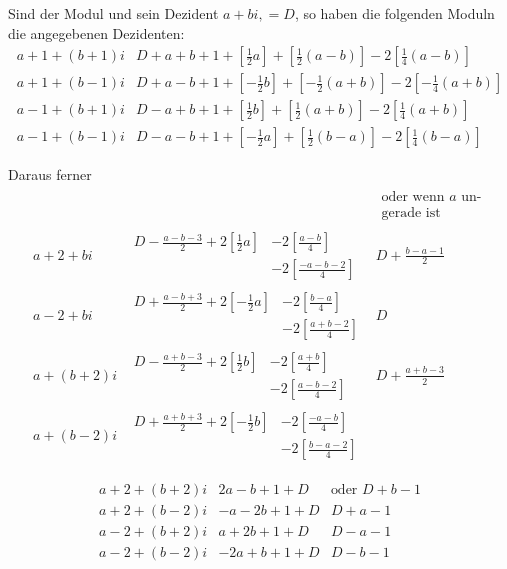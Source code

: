 Sind der Modul und sein Dezident $a+bi,=D$, so haben die folgenden Moduln die angegebenen Dezidenten:
{\small
\[
\begin{array}{l|l}
a+1+(b+1)i&D+a+b+1+[\tfrac12a]+[\tfrac12(a-b)]-2[\tfrac14(a-b)]\\
a+1+(b-1)i&D+a-b+1+[-\tfrac12b]+[-\tfrac12(a+b)]-2[-\tfrac14(a+b)]\\
a-1+(b+1)i&D-a+b+1+[\tfrac12b]+[\tfrac12(a+b)]-2[\tfrac14(a+b)]\\
a-1+(b-1)i&D-a-b+1+[-\tfrac12a]+[\tfrac12(b-a)]-2[\tfrac14(b-a)]
\end{array}
\]
}

Daraus ferner
{\footnotesize
\[
\begin{array}{l|l|l}
&&\begin{gathered}\text{oder wenn }a\text{ un-}\\\text{gerade ist}\end{gathered}\\
a+2+bi&\begin{aligned}D-\tfrac{a-b-3}2+2[\tfrac12a]&-2[\tfrac{a-b}4]\\&-2[\tfrac{-a-b-2}4]\end{aligned}&D+\tfrac{b-a-1}2\\[1ex]
a-2+bi&\begin{aligned}D+\tfrac{a-b+3}2+2[-\tfrac12a]&-2[\tfrac{b-a}4]\\&-2[\tfrac{a+b-2}4]\end{aligned}&D\\[1ex]
a+(b+2)i&\begin{aligned}D-\tfrac{a+b-3}2+2[\tfrac12b]&-2[\tfrac{a+b}4]\\&-2[\tfrac{a-b-2}4]\end{aligned}&D+\tfrac{a+b-3}2\\[1ex]
a+(b-2)i&\begin{aligned}D+\tfrac{a+b+3}2+2[-\tfrac12b]&-2[\tfrac{-a-b}4]\\&-2[\tfrac{b-a-2}4]\end{aligned}&
\end{array}
\]
}

\[
\begin{array}{l|rl}
a+2+(b+2)i&2a-b+1+D&\text{oder }D+b-1\\
a+2+(b-2)i&-a-2b+1+D&D+a-1\\
a-2+(b+2)i&a+2b+1+D&D-a-1\\
a-2+(b-2)i&-2a+b+1+D&D-b-1
\end{array}
\]


